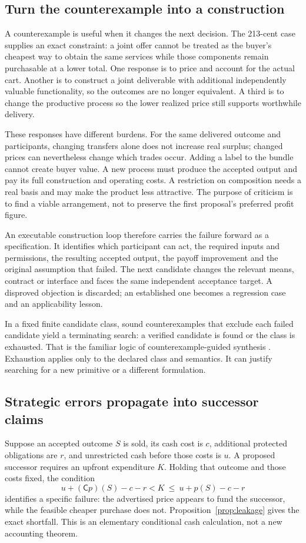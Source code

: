 \subsection{Turn the counterexample into a construction}
A counterexample is useful when it changes the next decision. The 213-cent case supplies an exact constraint: a joint offer cannot be treated as the buyer's cheapest way to obtain the same services while those components remain purchasable at a lower total. One response is to price and account for the actual cart. Another is to construct a joint deliverable with additional independently valuable functionality, so the outcomes are no longer equivalent. A third is to change the productive process so the lower realized price still supports worthwhile delivery.

These responses have different burdens. For the same delivered outcome and participants, changing transfers alone does not increase real surplus; changed prices can nevertheless change which trades occur. Adding a label to the bundle cannot create buyer value. A new process must produce the accepted output and pay its full construction and operating costs. A restriction on composition needs a real basis and may make the product less attractive. The purpose of criticism is to find a viable arrangement, not to preserve the first proposal's preferred profit figure.

An executable construction loop therefore carries the failure forward as a specification. It identifies which participant can act, the required inputs and permissions, the resulting accepted output, the payoff improvement and the original assumption that failed. The next candidate changes the relevant means, contract or interface and faces the same independent acceptance target. A disproved objection is discarded; an established one becomes a regression case and an applicability lesson.

In a fixed finite candidate class, sound counterexamples that exclude each failed candidate yield a terminating search: a verified candidate is found or the class is exhausted. That is the familiar logic of counterexample-guided synthesis \cite{cegis}. Exhaustion applies only to the declared class and semantics. It can justify searching for a new primitive or a different formulation.

\subsection{Strategic errors propagate into successor claims}
Suppose an accepted outcome $S$ is sold, its cash cost is $c$, additional protected obligations are $r$, and unrestricted cash before those costs is $u$. A proposed successor requires an upfront expenditure $K$. Holding that outcome and those costs fixed, the condition
\begin{equation}
u+(\mathsf{C}p)(S)-c-r<K
\ \le\ u+p(S)-c-r
\label{eq:leakage}
\end{equation}
identifies a specific failure: the advertised price appears to fund the successor, while the feasible cheaper purchase does not. Proposition~\ref{prop:leakage} gives the exact shortfall. This is an elementary conditional cash calculation, not a new accounting theorem.

